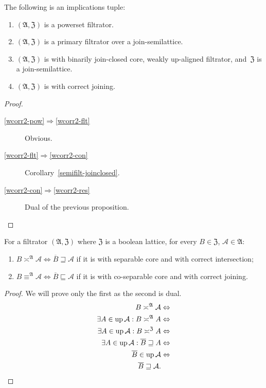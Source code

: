 \begin{prop}\label{is-corr-join}
The following is an implications tuple:
\begin{enumerate}
 \item\label{wcorr2-pow} $(\mathfrak{A},\mathfrak{Z})$ is a powerset filtrator.
 \item\label{wcorr2-flt}  $(\mathfrak{A},\mathfrak{Z})$ is a primary filtrator over
   a join-semilattice.
 \item\label{wcorr2-con} $(\mathfrak{A},\mathfrak{Z})$ is with binarily join-closed core,
   weakly up-aligned filtrator, and~$\mathfrak{Z}$ is a join-semilattice.
 \item\label{wcorr2-res} $(\mathfrak{A},\mathfrak{Z})$ is with correct joining.
\end{enumerate}
\end{prop}

\begin{proof}
~
\begin{description}
 \item[\ref{wcorr2-pow}$\Rightarrow$\ref{wcorr2-flt}] Obvious.
 \item[\ref{wcorr2-flt}$\Rightarrow$\ref{wcorr2-con}]
  Corollary~\ref{semifilt-joinclosed}.
 \item[\ref{wcorr2-con}$\Rightarrow$\ref{wcorr2-res}]
  Dual of the previous proposition.
\end{description}
\end{proof}

\begin{lem}\label{int-join-lem}
\label{bool-compl}For a filtrator $(\mathfrak{A},\mathfrak{Z})$
where $\mathfrak{Z}$ is a boolean lattice, for every $B\in\mathfrak{Z}$,
$\mathcal{A}\in\mathfrak{A}$:
\begin{enumerate}
\item $B\asymp^{\mathfrak{A}}\mathcal{A}\Leftrightarrow\overline{B}\sqsupseteq\mathcal{A}$
if it is with separable core and with correct intersection;
\item $B\equiv^{\mathfrak{A}}\mathcal{A}\Leftrightarrow\overline{B}\sqsubseteq\mathcal{A}$
if it is with co-separable core and with correct joining.
\end{enumerate}
\end{lem}
\begin{proof}
We will prove only the first as the second is dual.
\begin{align*}
B\asymp^{\mathfrak{A}}\mathcal{A} & \Leftrightarrow\\
\exists A\in\operatorname{up}\mathcal{A}:B\asymp^{\mathfrak{A}}A & \Leftrightarrow\\
\exists A\in\operatorname{up}\mathcal{A}:B\asymp^{\mathfrak{Z}}A & \Leftrightarrow\\
\exists A\in\operatorname{up}\mathcal{A}:\overline{B}\sqsupseteq A & \Leftrightarrow\\
\overline{B}\in\operatorname{up}\mathcal{A} & \Leftrightarrow\\
\overline{B}\sqsupseteq\mathcal{A}.
\end{align*}

\end{proof}


